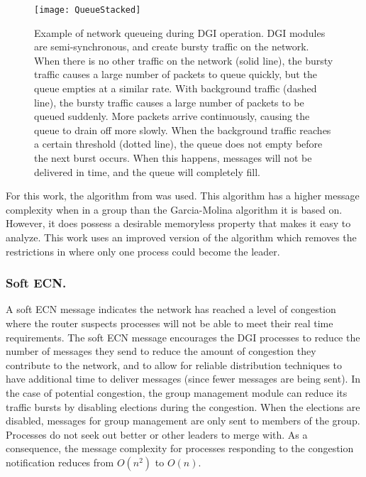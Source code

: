 \begin{figure}
\centering
\texttt{[image: QueueStacked]}
\caption{
Example of network queueing during \ac{DGI} operation. \ac{DGI} modules are semi-synchronous, and create bursty traffic on the network.
When there is no other traffic on the network (solid line), the bursty traffic causes a large number of packets to queue quickly, but the queue empties at a similar rate.
With background traffic (dashed line), the bursty traffic causes a large number of packets to be queued suddenly. More packets arrive continuously, causing the queue to drain off more slowly.
When the background traffic reaches a certain threshold (dotted line), the queue does not empty before the next burst occurs. When this happens, messages will not be delivered in time, and the queue will completely fill.
}
\label{fig:queue-types}
\end{figure}

For this work, the algorithm from \cite{JOURNAL} was used.
This algorithm has a higher message complexity when in a group than the Garcia-Molina algorithm it is based on.
However, it does possess a desirable memoryless property that makes it easy to analyze.
This work uses an improved version of the algorithm which removes the restrictions in \cite{JOURNAL} where only one process could become the leader.

\subsubsection{Soft \ac{ECN}.}

A soft \ac{ECN} message indicates the network has reached a level of congestion where the router suspects processes will not be able to meet their real time requirements.
The soft \ac{ECN} message encourages the \ac{DGI} processes to reduce the number of messages they send to reduce the amount of congestion they contribute to the network, and to allow for reliable distribution techniques to have additional time to deliver messages (since fewer messages are being sent).
In the case of potential congestion, the group management module can reduce its traffic bursts by disabling elections during the congestion.
When the elections are disabled, messages for group management are only sent to members of the group.
Processes do not seek out better or other leaders to merge with.
As a consequence, the message complexity for processes responding to the congestion notification reduces from $O(n^2)$ to $O(n)$.

